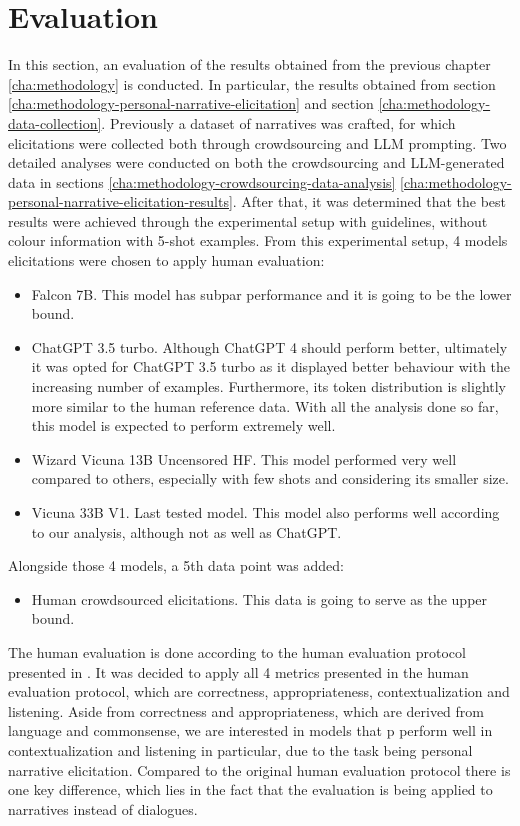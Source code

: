 \chapter{Evaluation}
\label{cha:evaluation}

In this section, an evaluation of the results obtained from the previous chapter \ref{cha:methodology} is conducted. In particular, the results obtained from section \ref{cha:methodology-personal-narrative-elicitation} and section \ref{cha:methodology-data-collection}. 
Previously a dataset of narratives was crafted, for which elicitations were collected both through crowdsourcing and LLM prompting.
Two detailed analyses were conducted on both the crowdsourcing and LLM-generated data in sections \ref{cha:methodology-crowdsourcing-data-analysis} \ref{cha:methodology-personal-narrative-elicitation-results}. After that, it was determined that the best results were achieved through the experimental setup with guidelines, without colour information with 5-shot examples. 
From this experimental setup, 4 models elicitations were chosen to apply human evaluation:
\begin{itemize}
    \item Falcon 7B. This model has subpar performance and it is going to be the lower bound.
    \item ChatGPT 3.5 turbo. Although ChatGPT 4 should perform better, ultimately it was opted for ChatGPT 3.5 turbo as it displayed better behaviour with the increasing number of examples. Furthermore, its token distribution is slightly more similar to the human reference data. With all the analysis done so far, this model is expected to perform extremely well.
    \item Wizard Vicuna 13B Uncensored HF. This model performed very well compared to others, especially with few shots and considering its smaller size.
    \item Vicuna 33B V1. Last tested model. This model also performs well according to our analysis, although not as well as ChatGPT.
\end{itemize}
Alongside those 4 models, a 5th data point was added:
\begin{itemize}
    \item Human crowdsourced elicitations. This data is going to serve as the upper bound.
\end{itemize}
The human evaluation is done according to the human evaluation protocol presented in \cite{mousavi-etal-2022-evaluation}. It was decided to apply all 4 metrics presented in the human evaluation protocol, which are correctness, appropriateness, contextualization and listening. Aside from correctness and appropriateness, which are derived from language and commonsense, we are interested in models that p
perform well in contextualization and listening in particular, due to the task being personal narrative elicitation. Compared to the original human evaluation protocol there is one key difference, which lies in the fact that the evaluation is being applied to narratives instead of dialogues. 



